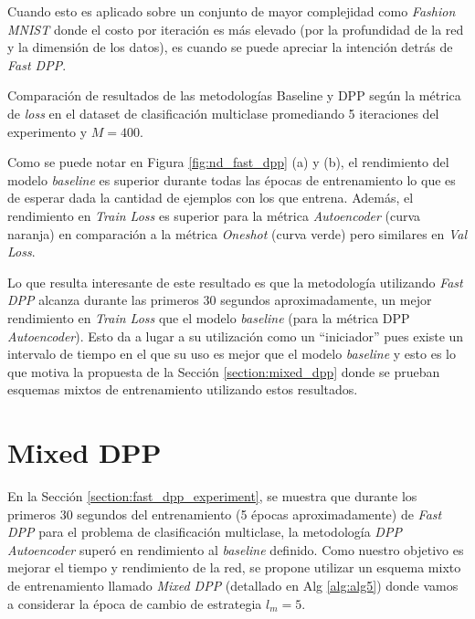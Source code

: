 \vspace{0.2cm}

Cuando esto es aplicado sobre un conjunto de mayor complejidad como \textit{Fashion MNIST} donde el costo por iteración es más elevado (por la profundidad de la red y la dimensión de los datos), es cuando se puede apreciar la intención detrás de \textit{Fast DPP}.

\begin{images}[\label{fig:nd_fast_dpp}]{\centering Comparación de resultados de las metodologías Baseline y DPP según la métrica de \textit{loss} en el dataset de clasificación multiclase promediando 5 iteraciones del experimento y $M=400$.}

\end{images}

Como se puede notar en Figura \ref{fig:nd_fast_dpp} (a) y (b), el rendimiento del modelo \textit{baseline} es superior durante todas las épocas de entrenamiento lo que es de esperar dada la cantidad de ejemplos con los que entrena. Además, el rendimiento en \textit{Train Loss} es superior para la métrica \textit{Autoencoder} (curva naranja) en comparación a la métrica \textit{Oneshot} (curva verde) pero similares en \textit{Val Loss}.

\vspace{0.2cm}

Lo que resulta interesante de este resultado es que la metodología utilizando \textit{Fast DPP} alcanza durante las primeros 30 segundos aproximadamente, un mejor rendimiento en \textit{Train Loss} que el modelo \textit{baseline} (para la métrica DPP \textit{Autoencoder}). Esto da a lugar a su utilización como un ``iniciador'' pues existe un intervalo de tiempo en el que su uso es mejor que el modelo \textit{baseline} y esto es lo que motiva la propuesta de la Sección \ref{section:mixed_dpp} donde se prueban esquemas mixtos de entrenamiento utilizando estos resultados. 

\section{Mixed DPP}

En la Sección \ref{section:fast_dpp_experiment}, se muestra que durante los primeros 30 segundos del entrenamiento (5 épocas aproximadamente) de \textit{Fast DPP} para el problema de clasificación multiclase, la metodología \textit{DPP Autoencoder} superó en rendimiento al \textit{baseline} definido. Como nuestro objetivo es mejorar el tiempo y rendimiento de la red, se propone utilizar un esquema mixto de entrenamiento llamado \textit{Mixed DPP} (detallado en Alg \ref{alg:alg5}) donde vamos a considerar la época de cambio de estrategia $l_m = 5$.

